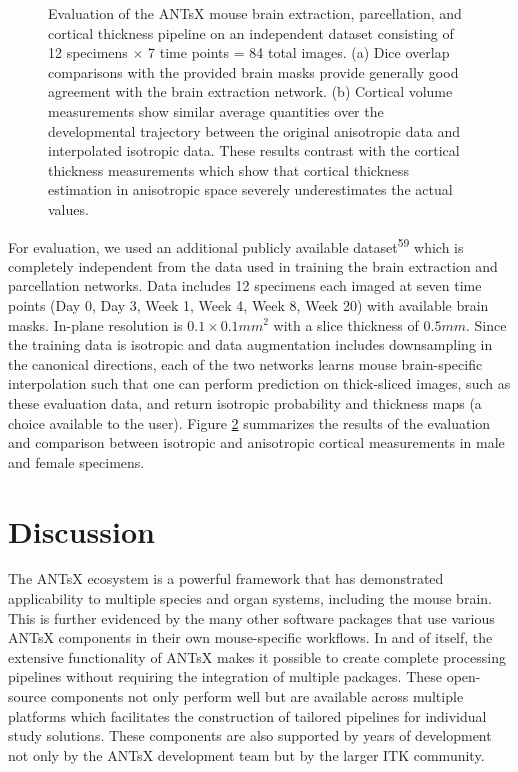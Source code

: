 \documentclass[
  12pt,
]{article}
\begin{document}
\begin{figure}
\begin{subfigure}{.5\textwidth}
  \caption{}
  \label{fig:subc}
\end{subfigure}
\caption{Evaluation of the ANTsX mouse brain extraction, parcellation, and
cortical thickness pipeline on an independent dataset 
consisting of 12 specimens $\times$ 7 time points = 
84 total images.  (a) Dice overlap comparisons with the provided brain
masks provide generally good agreement with the brain extraction network.
(b) Cortical volume measurements show similar average quantities over
the developmental trajectory between the original anisotropic data and 
interpolated isotropic data.  These results contrast with the cortical
thickness measurements which show that cortical thickness estimation 
in anisotropic space severely underestimates the actual values.}
\label{fig:evaluation}
\end{figure}

For evaluation, we used an additional publicly available
dataset\textsuperscript{59} which is completely independent from the
data used in training the brain extraction and parcellation networks.
Data includes 12 specimens each imaged at seven time points (Day 0, Day
3, Week 1, Week 4, Week 8, Week 20) with available brain masks. In-plane
resolution is \(0.1 \times 0.1 mm^2\) with a slice thickness of
\(0.5 mm\). Since the training data is isotropic and data augmentation
includes downsampling in the canonical directions, each of the two
networks learns mouse brain-specific interpolation such that one can
perform prediction on thick-sliced images, such as these evaluation
data, and return isotropic probability and thickness maps (a choice
available to the user). Figure \ref{fig:evaluation} summarizes the
results of the evaluation and comparison between isotropic and
anisotropic cortical measurements in male and female specimens.

\clearpage
\newpage

\hypertarget{discussion}{%
\section*{Discussion}\label{discussion}}

The ANTsX ecosystem is a powerful framework that has demonstrated
applicability to multiple species and organ systems, including the mouse
brain. This is further evidenced by the many other software packages
that use various ANTsX components in their own mouse-specific workflows.
In and of itself, the extensive functionality of ANTsX makes it possible
to create complete processing pipelines without requiring the
integration of multiple packages. These open-source components not only
perform well but are available across multiple platforms which
facilitates the construction of tailored pipelines for individual study
solutions. These components are also supported by years of development
not only by the ANTsX development team but by the larger ITK community.
\end{document}
